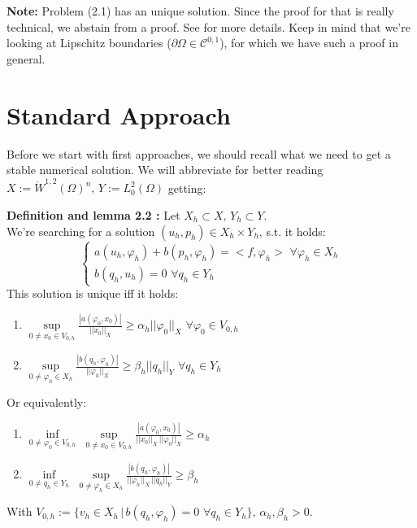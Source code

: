 \documentclass[12pt,a4paper]{report}
\begin{document}
\textbf{Note:} Problem (2.1) has an unique solution. Since the proof for that is really technical, we abstain from a proof. See \cite{NecasSol} for more details. Keep in mind that we're looking at Lipschitz boundaries (\(\partial \Omega \in \mathcal{C}^{0,1}\)), for which we have such a proof in general.
\newpage
\section{Standard Approach}
Before we start with first approaches, we should recall what we need to get a stable numerical solution. We will abbreviate for better reading \(X:=\mathring{W}^{1,2}(\Omega)^n, \, Y:=L^2_0(\Omega)\) getting:\\
\colorbox{defblue}{\begin{minipage}{15cm}{\textcolor{black}{}{\label{def2.2}}}
\textbf{Definition and lemma 2.2 \cite{NumFlow}:} Let \(X_h \subset X, \, Y_h \subset Y\). \\We're searching for a solution \((u_h,p_h) \in X_h \times Y_h\), s.t. it holds:
\begin{equation}
\begin{cases}
    a(u_h,\varphi_h) + b(p_h,\varphi_h) = <f,\varphi_h> \,\, \forall \varphi_h \in X_h\\
    b(q_h,u_h) = 0 \,\, \forall q_h \in Y_h
\end{cases}
\end{equation}
This solution is unique iff it holds:
\begin{enumerate}
    \item $\sup\limits_{0 \neq x_0 \in V_{0,h}} \frac{|a(\varphi_0,x_0)|}{||x_0||_X} \geq \alpha_h ||\varphi_0||_X\,\, \forall \varphi_0 \in V_{0,h}$
    \item $\sup\limits_{0 \neq \varphi_h \in X_h} \frac{|b(q_h,\varphi_h)|}{||\varphi_h||_X} \geq \beta_h ||q_h||_Y\,\, \forall q_h \in Y_h$
\end{enumerate}
Or equivalently:
\begin{enumerate}
    \item $\inf\limits_{0\neq \varphi_0 \in V_{0,h}}\,\,\sup\limits_{0 \neq x_0 \in V_{0,h}} \frac{|a(\varphi_0,x_0)|}{||x_0||_X\,||\varphi_0||_X} \geq \alpha_h$
    \item $\inf\limits_{0\neq q_h \in Y_h}\,\,\sup\limits_{0 \neq \varphi_h \in X_h} \frac{|b(q_h,\varphi_h)|}{||\varphi_h||_X \, ||q_h||_Y} \geq \beta_h$
\end{enumerate}
With \(V_{0,h} := \{v_h \in X_h \, | \, b(q_h,\varphi_h) = 0 \,\,\forall q_h \in Y_h\}, \, \alpha_h, \beta_h > 0.\)
\end{minipage}}\\
\end{document}
